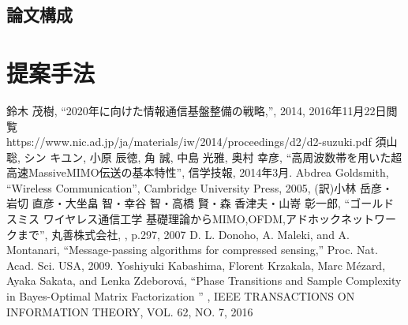 \documentclass[report]{jsbook}
\begin{document}
\section{論文構成}
\chapter{提案手法}


\newpage
  \begin{thebibliography}{10}
    鈴木 茂樹, ``2020年に向けた情報通信基盤整備の戦略,'', 2014, 2016年11月22日閲覧 \\ {https://www.nic.ad.jp/ja/materials/iw/2014/proceedings/d2/d2-suzuki.pdf}
    須山 聡, シン キユン, 小原 辰徳, 角 誠, 中島 光雅, 奥村 幸彦, ``高周波数帯を用いた超高速MassiveMIMO伝送の基本特性'', 信学技報, 2014年3月.
    Abdrea Goldsmith, ``Wireless Communication'', Cambridge University Press, 2005, (訳)小林 岳彦・ 岩切 直彦・大坐畠 智・幸谷 智・高橋 賢・森 香津夫・山嵜 彰一郎, ``ゴールドスミス ワイヤレス通信工学 基礎理論からMIMO,OFDM,アドホックネットワークまで'', 丸善株式会社, , p.297, 2007
    D. L. Donoho, A. Maleki, and A. Montanari, “Message-passing algorithms for compressed sensing,” Proc. Nat. Acad. Sci. USA, 2009. 
    Yoshiyuki Kabashima, Florent Krzakala, Marc Mézard, Ayaka Sakata, and Lenka Zdeborová, ``Phase Transitions and Sample Complexity in Bayes-Optimal Matrix Factorization '' , IEEE TRANSACTIONS ON INFORMATION THEORY, VOL. 62, NO. 7, 2016

  \end{thebibliography}
\end{document}
